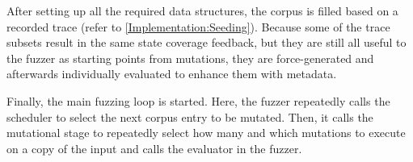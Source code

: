 \documentclass[twocolumn]{article}
\newcommand{\code}[2][]{\lstinline[language=#1, breaklines=false, basicstyle=\ttfamily]{#2}}
\let\savedCite=\cite
\renewcommand{\cite}{\unskip~\savedCite}
\begin{document}

After setting up all the required data structures, the corpus is filled based on a recorded trace (refer to \cref{Implementation:Seeding}). Because some of the trace subsets result in the same state coverage feedback, but they are still all useful to the fuzzer as starting points from mutations, they are force-generated and afterwards individually evaluated to enhance them with metadata.

Finally, the main fuzzing loop is started. Here, the fuzzer repeatedly calls the scheduler to select the next corpus entry to be mutated. Then, it calls the mutational stage to repeatedly select how many and which mutations to execute on a copy of the input and calls the evaluator in the fuzzer.
\end{document}
